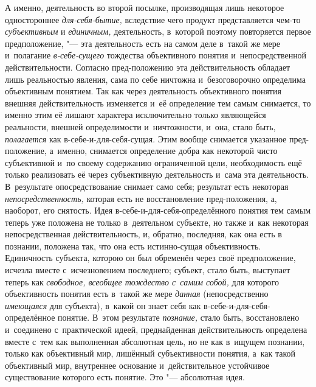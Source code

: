 А именно, деятельность во второй посылке, производящая лишь
некоторое одностороннее
{\em для-себя-бытие,}
вследствие чего продукт представляется чем-то
{\em субъективным} и
{\em единичным,}
деятельность, в~которой поэтому повторяется первое
предположение, "--- эта деятельность есть на самом деле в~такой
же мере и~полагание {\em в-себе-сущего}
тождества объективного понятия и~непосредственной
действительности. Согласно пред-положению эта действительность
обладает лишь реальностью явления, сама по себе ничтожна и~безоговорочно
определима объективным понятием. Так как через деятельность объективного
понятия внешняя действительность изменяется и~её определение тем самым
снимается, то именно этим её лишают характера исключительно только
являющейся реальности, внешней определимости и~ничтожности, и~она, стало
быть, {\em полагается}
как в-себе-и-для-себя-сущая. Этим вообще снимается указанное
пред-положение, а~именно, снимается определение добра как некоторой чисто
субъективной и~по своему содержанию ограниченной цели, необходимость ещё
только реализовать её через субъективную деятельность и~сама эта
деятельность. В~результате опосредствование снимает само себя; результат
есть некоторая
{\em непосредственность,}
которая есть не восстановление пред-положения, а, наоборот,
его снятость. Идея в-себе-и-для-себя-определённого понятия тем самым теперь
уже положена не только в~деятельном субъекте, но также и~как некоторая
непосредственная действительность, и, обратно, последняя, как она есть в
познании, положена так, что она есть истинно-сущая объективность.
Единичность субъекта, которою он был обременён через своё предположение,
исчезла вместе с~исчезновением последнего; субъект, стало быть, выступает
теперь как {\em свободное, всеобщее
тождество с~самим собой,} для которого объективность понятия
есть в~такой же мере {\em данная}
(непосредственно
{\em имеющаяся} для
субъекта), в~какой он знает себя как в-себе-и-для-себя-определённое
понятие. В~этом результате
{\em познание,} стало
быть, восстановлено и~соединено с~практической идеей,
преднайденная действительность определена вместе с~тем как выполненная
абсолютная цель, но не как в~ищущем познании, только как объективный мир,
лишённый субъективности понятия, а~как такой объективный мир, внутреннее
основание и~действительное устойчивое существование которого есть понятие.
Это "--- абсолютная идея.

